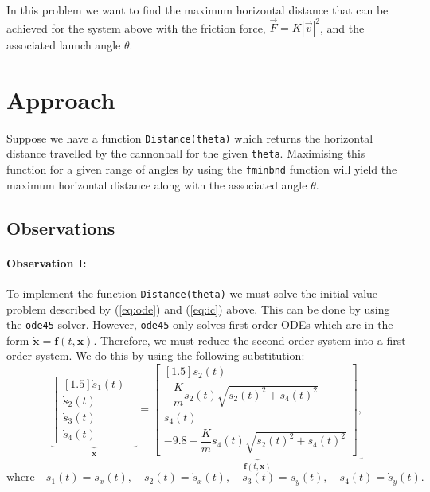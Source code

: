 \documentclass[11pt]{report}
\begin{document}
In this problem we want to find the maximum horizontal distance that can be achieved for the system above with the friction force, $\vec{F}=K |\vec{v}|^2$, and the associated launch angle $\theta$.

\section{Approach}

Suppose we have a function \texttt{Distance(theta)} which returns the horizontal distance travelled by the cannonball for the given \texttt{theta}. Maximising this function for a given range of angles by using the \texttt{fminbnd} function will yield the maximum horizontal distance along with the associated angle $\theta$.

\subsection{Observations}
\paragraph{Observation I:} To implement the function \texttt{Distance(theta)} we must solve the initial value problem described by (\ref{eq:ode}) and (\ref{eq:ic}) above. This can be done by using the \texttt{ode45} solver. However, \texttt{ode45} only solves first order ODEs which are in the form $\dot{\boldsymbol{x}}=\boldsymbol{f}(t,\boldsymbol{x})$. Therefore, we must reduce the second order system into a first order system. We do this by using the following substitution:
	\begin{equation}
		\underbrace{
		\begin{bmatrix}[1.5]
			\dot{s}_1(t) \\ \dot{s}_2(t) \\ \dot{s}_3(t) \\ \dot{s}_4(t)
		\end{bmatrix}
		}_{\boldsymbol{\dot{x}}}
		=
		\underbrace{
		\begin{bmatrix}[1.5]
			{s}_2(t) \\ -\dfrac{K}{m}s_2(t)\sqrt{s_2(t)^2 + s_4(t)^2} \\ {s}_4(t) \\ -9.8 -\dfrac{K}{m}s_4(t)\sqrt{s_2(t)^2 + s_4(t)^2}
		\end{bmatrix},
		}_{\boldsymbol{f}(t,\boldsymbol{x})}
		\label{eq:ode45}
	\end{equation}
	$$\text{where}\quad s_1(t)=s_x(t), \quad s_2(t)=\dot{s}_x(t), \quad s_3(t)=s_y(t), \quad s_4(t)=\dot{s}_y(t).$$
		
\end{document}
